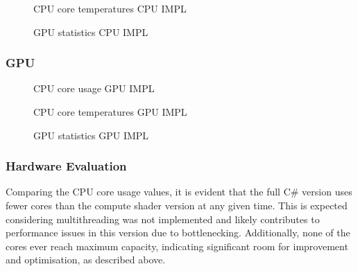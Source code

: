 \documentclass[12pt]{article}
\newcommand{\wideimage}[2][]{%
  \makebox[\textwidth][c]{\texttt{[image: \#2]}}%
}
\begin{document}
    \begin{figure}[H]
        \begin{center}
            \wideimage[width=0.75\textwidth, height=0.41\textheight]{afterCPUTempCPU.png}
            \caption{CPU core temperatures CPU IMPL}
        \end{center}
    \end{figure}

    \begin{figure}[H]
        \begin{center}
            \wideimage[width=0.75\textwidth, height=0.41\textheight]{afterGPUCPU.png}
            \caption{GPU statistics CPU IMPL}
        \end{center}
    \end{figure}

    \subsubsection{GPU}

    \begin{figure}[H]
        \begin{center}
            \wideimage[width=1.1\textwidth]{afterCPUUsageGPU.png}
            \caption{CPU core usage GPU IMPL}
        \end{center}
    \end{figure}

    \begin{figure}[H]
        \begin{center}
            \wideimage[width=0.75\textwidth, height=0.41\textheight]{afterCPUTempGPU.png}
            \caption{CPU core temperatures GPU IMPL}
        \end{center}
    \end{figure}

    \begin{figure}[H]
        \begin{center}
            \wideimage[width=0.75\textwidth, height=0.41\textheight]{afterGPUGPU.png}
            \caption{GPU statistics GPU IMPL}
        \end{center}
    \end{figure}

    \subsubsection{Hardware Evaluation}

    Comparing the CPU core usage values, it is evident that the full C\# version uses fewer cores than the compute shader version at any given time. This is expected considering multithreading was not implemented and likely contributes to performance issues in this version due to bottlenecking. Additionally, none of the cores ever reach maximum capacity, indicating significant room for improvement and optimisation, as described above.
    
\end{document}
